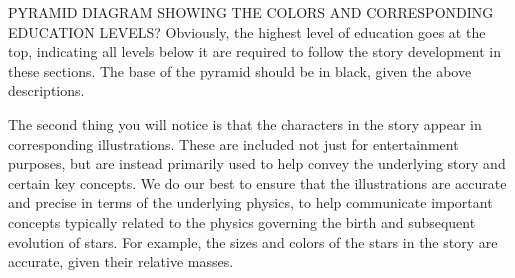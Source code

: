\documentclass[main.tex]{subfiles}
\begin{document}
PYRAMID DIAGRAM SHOWING THE COLORS AND CORRESPONDING EDUCATION LEVELS?  Obviously, the highest level of education goes at the top, indicating all levels below it are required to follow the story development in these sections.  The base of the pyramid should be in black, given the above descriptions.

The second thing you will notice is that the characters in the story appear in corresponding illustrations.  These are included not just for entertainment purposes, but are instead primarily used to help convey the underlying story and certain key concepts.  We do our best to ensure that the illustrations are accurate and precise in terms of the underlying physics, to help communicate important concepts typically related to the physics governing the birth and subsequent evolution of stars.  For example, the sizes and colors of the stars in the story are accurate, given their relative masses.

\end{document}
